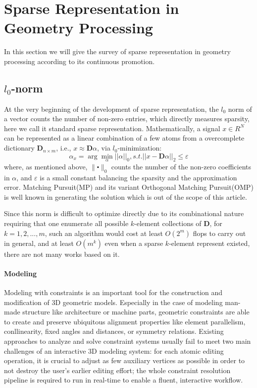 \section{Sparse Representation in Geometry Processing}
\label{sec:L0}

In this section we will give the survey of sparse representation in geometry processing according to its continuous promotion.

\subsection{$l_0$-norm}

At the very beginning of the development of sparse representation, the $l_0$ norm of a vector counts the number of non-zero entries, which directly measures sparsity, here we call it standard sparse representation. Mathematically, a signal $x\in R^{N}$ can be represented as a linear combination of a few atoms from a overcomplete dictionary $\mathbf{D}_{n \times m}$, i.e., $x\approx\mathbf{D}\alpha$, via $l_0$-minimization:
\begin{equation}
 \label{eq:L0 modeling}
 \alpha_{x} = \arg\min_{\alpha}||\alpha||_0, s.t. ||x-\mathbf{D}\alpha||_2 \le \varepsilon
\end{equation}
where, as mentioned above, $\|\centerdot\|_0$ counts the number of the non-zero coefficients in $\alpha$, and $\varepsilon$ is a small constant balancing the sparsity and the approximation error. Matching Pursuit(MP)\cite{mallat1993matching} and its variant Orthogonal Matching Pursuit(OMP)\cite{pati1993orthogonal} is well known in generating the solution which is out of the scope of this article.

Since this norm is difficult to optimize directly due to its combinational nature requiring that one enumerate all possible $k$-element collections of $\mathbf{D}$, for $k=1,2,...,m$, such an algorithm would cost at least $O(2^{m})$ flops to carry out in general, and at least $O(m^{k})$ even when a sparse $k$-element represent existed, there are not many works based on it.

\paragraph{Modeling}Modeling with constraints is an important tool for the construction and modification of 3D geometric models. Especially in the case of modeling man-made structure like architecture or machine parts, geometric constraints are able to create and preserve ubiquitous alignment properties like element parallelism, conllinearity, fixed angles and distances, or symmetry relations. Existing approaches to analyze and solve constraint systems usually fail to meet two main challenges of an interactive 3D modeling system: for each atomic editing operation, it is crucial to adjust as few auxiliary vertices as possible in order to not destroy the user's earlier editing effort; the whole constraint resolution pipeline is required to run in real-time to enable a fluent, interactive workflow.

